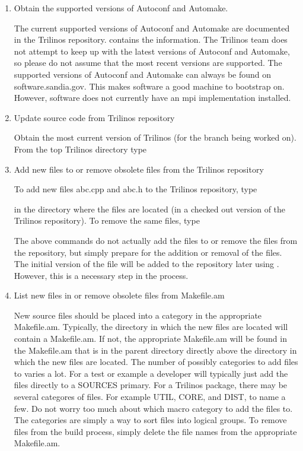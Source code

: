\documentclass[12pt,relax]{TrilinosDevGuide}
\begin{document}
\begin{enumerate}
\item Obtain the supported versions of Autoconf and Automake.

The current supported versions of Autoconf and Automake are documented in 
the Trilinos repository.  
 contains the 
information.  The Trilinos team does not attempt to keep up with the latest 
versions of Autoconf and Automake, so please do not assume that the most 
recent versions are supported.  The supported versions of Autoconf and 
Automake can always be found on software.sandia.gov.  This makes software a 
good machine to bootstrap on.  However, software does not currently have an
mpi implementation installed.

\item Update source code from Trilinos repository

Obtain the most current version of Trilinos (for the branch being worked on).  
From the top Trilinos directory type


\item Add new files to or remove obsolete files from the Trilinos repository

To add new files abc.cpp and abc.h to the Trilinos repository, type


in the directory where the files are located (in a checked out version of the 
Trilinos repository).  To remove the same files, type


The above commands do not actually add the files to or remove the files from 
the repository, but simply prepare for the addition or removal of the files.  
The initial version of the file will be added to the repository later using 
.  However, this is a necessary step in the process.

\item List new files in or remove obsolete files from Makefile.am

New source files should be placed into a category in the appropriate 
Makefile.am.  Typically, the directory in which the new files are located will 
contain a Makefile.am.  If not, the appropriate Makefile.am will be found in 
the Makefile.am that is in the parent directory directly above the directory 
in which the new files are located.  The number of possibly categories to add 
files to varies a lot.  For a test or example a developer will typically just 
add the files directly to a SOURCES primary.  For a Trilinos package, there 
may be several categores of files.  For example UTIL, CORE, and DIST, to name 
a few.  Do not worry too much about which macro category to add the files to.  
The categories are simply a way to sort files into logical groups.  To remove 
files from the build process, simply delete the file names from the 
appropriate Makefile.am.


\end{enumerate}
\end{document}

